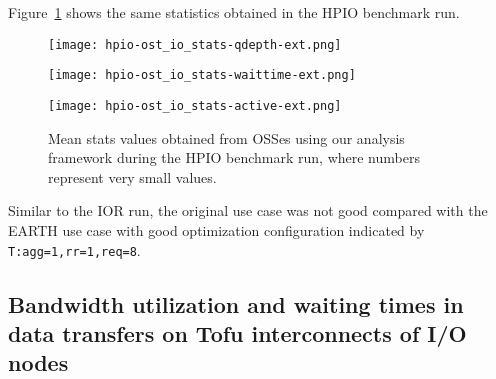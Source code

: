 \documentclass{jhps}
\begin{document}
Figure~\ref{fig:HPIO_OST_IO_STATS} shows the same statistics obtained
in the HPIO benchmark run.
%
\begin{figure}[tb]
\centering
\begin{minipage}[t]{0.44\textwidth}
 \centering
 \texttt{[image: hpio-ost\_io\_stats-qdepth-ext.png]}
 \label{fig:HPIO_req_qdepth}
\end{minipage}
%
\noindent
\begin{minipage}[t]{0.44\textwidth}
 \centering
 \texttt{[image: hpio-ost\_io\_stats-waittime-ext.png]}
 \label{fig:HPIO_req_waittime}
\end{minipage}
%
\noindent
\begin{minipage}[t]{0.44\textwidth}
 \centering
 \texttt{[image: hpio-ost\_io\_stats-active-ext.png]}
 \label{fig:HPIO_req_active}
\end{minipage}
%
\caption{Mean stats values obtained from OSSes using our analysis framework
during the HPIO benchmark run, where numbers represent very small values.}
\label{fig:HPIO_OST_IO_STATS}
\end{figure}
%
Similar to the IOR run, the original use case was not good compared
with the EARTH use case with good optimization configuration
indicated by {\tt T:agg=1,rr=1,req=8}.

\subsection{Bandwidth utilization and waiting times in data transfers on Tofu interconnects of I/O nodes}
\end{document}
